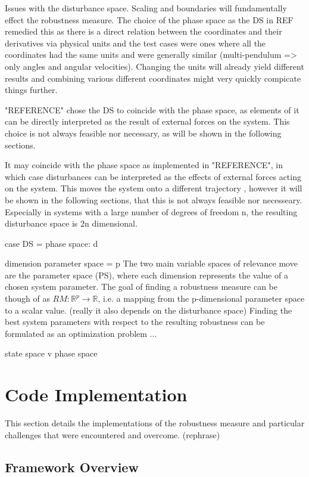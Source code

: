     Issues with the disturbance space. Scaling and boundaries will fundamentally effect the robustness measure. The choice of the phase space as the DS in REF remedied this as there is a direct relation between the coordinates and their derivatives via physical units and the test cases were ones where all the coordinates had the same units and were generally similar (multi-pendulum => only angles and angular velocities). Changing the units will already yield different results and combining various different coordinates might very quickly compicate things further. 




    "REFERENCE" chose the DS to coincide with the phase space, as elements of it can be directly interpreted as the result of external forces on the system. This choice is not always feasible nor necessary, as will be shown in the following sections. 

    It may coincide with the phase space as implemented in "REFERENCE", in which case disturbances can be interpreted as the effects of external forces acting on the system. This moves the system onto a different trajectory 
    , however it will be shown in the following sections, that this is not always feasible nor necesseary. Especially in systems with a large number of degrees of freedom n, the resulting disturbance space is 2n dimensional. 

    case DS = phase space: d

    dimension parameter space = p
    The two main variable spaces of relevance move are the parameter space (PS), where each dimension represents the value of a chosen system parameter. The goal of finding a robustness measure can be though of as $RM:\mathbb{R}^p \rightarrow \mathbb{R}$, i.e. a mapping from the p-dimensional parameter space to a scalar value. (really it also depends on the disturbance space) Finding the best system parameters with respect to the resulting robustness can be formulated as an optimization problem ...


    
    state space v phase space


\section{Code Implementation}

This section details the implementations of the robustness measure and particular challenges that were encountered and overcome. (rephrase)
\subsection{Framework Overview}


